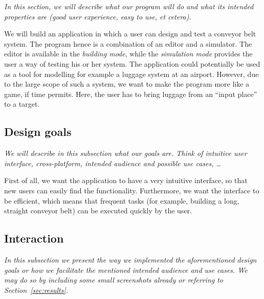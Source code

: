 \textit{In this section, we will describe what our program will do and what its intended properties are (good user experience, easy to use, et cetera).}

We will build an application in which a user can design and test a conveyor belt system. The program hence is a combination of an editor and a simulator. The editor is available in the \textit{building mode}, while the \textit{simulation mode} provides the user a way of testing his or her system. The application could potentially be used as a tool for modelling for example a luggage system at an airport. However, due to the large scope of such a system, we want to make the program more like a game, if time permits. Here, the user has to bring luggage from an ``input place'' to a target.

\subsection{Design goals}
\textit{We will describe in this subsection what our goals are. Think of intuitive user interface, cross-platform, intended audience and possible use cases, \ldots}

First of all, we want the application to have a very intuitive interface, so that new users can easily find the functionality. Furthermore, we want the interface to be efficient, which means that frequent tasks (for example, building a long, straight conveyor belt) can be executed quickly by the user.



\subsection{Interaction}
\textit{In this subsection we present the way we implemented the aforementioned design goals or how we facilitate the mentioned intended audience and use cases. We may do so by including some small screenshots already or referring to Section~\ref{sec:results}.}